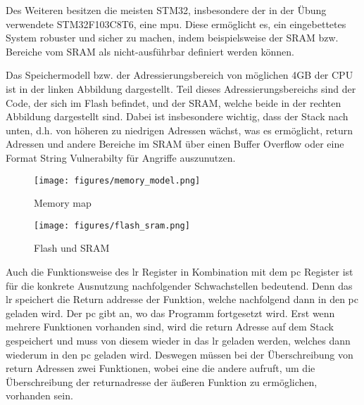 \documentclass[a4paper,
DIV=13,
12pt,
BCOR=10mm,
department=FakIM,
oneside,
parskip=half,
automark,
listof=totocnumbered,
bibliography=totocnumbered,
acronym=totocnumbered
] {OTHRartcl}
\begin{document}
Des Weiteren besitzen die meisten STM32, insbesondere der in der Übung verwendete STM32F103C8T6, eine \ac{mpu}.
Diese ermöglicht es, ein eingebettetes System robuster und sicher zu machen, indem beispielsweise der SRAM bzw. Bereiche vom SRAM als nicht-ausführbar definiert werden können.

Das Speichermodell bzw. der Adressierungsbereich von möglichen 4GB der CPU ist in der linken Abbildung dargestellt.
Teil dieses Adressierungsbereichs sind der Code, der sich im Flash befindet, und der SRAM, welche beide in der rechten Abbildung dargestellt sind.
Dabei ist insbesondere wichtig, dass der Stack nach unten, d.h. von höheren zu niedrigen Adressen wächst, was es ermöglicht,
return Adressen und andere Bereiche im SRAM über einen Buffer Overflow oder eine Format String Vulnerabilty für Angriffe auszunutzen.
\begin{figure}[ht!]
  \begin{minipage}[b]{.45\linewidth}
    \texttt{[image: figures/memory\_model.png]}
    \caption{Memory map}
    \label{fig: Memory map}
  \end{minipage}
  \hspace{.1\linewidth}
  \begin{minipage}[b]{.48\linewidth}
    \texttt{[image: figures/flash\_sram.png]}
    \caption{Flash und SRAM}
    \label{fig: Flash und SRAM}
  \end{minipage}
\end{figure}

Auch die Funktionsweise des \ac{lr} Register in Kombination mit dem \ac{pc} Register ist für die konkrete Ausnutzung nachfolgender Schwachstellen bedeutend.
Denn das \ac{lr} speichert die Return addresse der Funktion, welche nachfolgend dann in den \ac{pc} geladen wird. Der \ac{pc} gibt an, wo das Programm fortgesetzt wird.
Erst wenn mehrere Funktionen vorhanden sind, wird die return Adresse auf dem Stack gespeichert und muss von
diesem wieder in das \ac{lr} geladen werden, welches dann wiederum in den \ac{pc} geladen wird.
Deswegen müssen bei der Überschreibung von return Adressen zwei Funktionen, wobei eine die andere aufruft, um die Überschreibung
der returnadresse der äußeren Funktion zu ermöglichen, vorhanden sein.
\end{document}
